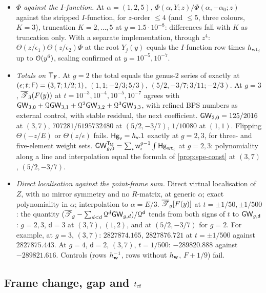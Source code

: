 \begin{itemize}
\item \emph{$\Phi$ against the $I$-function.} At $\alpha=(1,2,5)$, $\Phi(\alpha,Y;z)/\Phi(\alpha,-\alpha_0;z)$ against the stripped $I$-function, for $z$-order $\leq 4$ (and $\leq 5$, three colours, $K=3$), truncation $K=2,\dots,5$ at $y=1.5\cdot 10^{-8}$: differences fall with $K$ as truncation only. With a separate implementation, through $z^4$: $\Theta(z/\epsilon_1)\Theta(z/\epsilon_2)\Phi$ at the root $Y_j(y)$ equals the $I$-function row times $h_{\mathrm{wt}_j}$ up to $\mathcal{O}(y^6)$, scaling confirmed at $y=10^{-5},10^{-7}$.
\item \emph{Totals on $\mathsf{T}_{\mathrm{F}}$.} At $g=2$ the total equals the genus-$2$ series of \cite{BS} exactly at $(\epsilon;t;\mathsf{F})=(3,7;1/2;1)$, $(1,1;-2/3;5/3)$, $(5/2,-3/7;3/11;-2/3)$. At $g=3$, $\overline{\mathscr{T}}_3(F(y))$ at $t=10^{-3},10^{-4},10^{-5},10^{-7}$ agrees with $\mathsf{GW}_{3,0}+\mathcal{Q}\mathsf{GW}_{3,1}+\mathcal{Q}^2\mathsf{GW}_{3,2}+\mathcal{Q}^3\mathsf{GW}_{3,3}$, with refined BPS numbers as external control, with stable residual, the next coefficient. $\mathsf{GW}_{3,0}=125/2016$ at $(3,7)$, $707281/6195732480$ at $(5/2,-3/7)$, $1/10080$ at $(1,1)$. Flipping $\Theta(-z/E)$ or $\Theta(z/\epsilon)$ fails. $\mathsf{Hg}_{\mathsf{v}}=h_{\mathsf{v}}.1$ exactly at $g=2,3$, for three- and five-element weight sets. $\mathsf{GW}_{g,0}^{\mathsf{T}_{\!\mathrm{M}}}=\sum_i\mathsf{w}_i^{g-1}\int\mathsf{Hg}_{\mathrm{wt}_i}$ at $g=2,3$: polynomiality along a line and interpolation equal the formula of \cref{prop:spe-const} at $(3,7)$, $(5/2,-3/7)$.
\item \emph{Direct localisation against the point-frame sum.} Direct virtual localisation of $Z$, with no mirror symmetry and no $R$-matrix, at generic $\alpha$; exact polynomiality in $\alpha$; interpolation to $\alpha=E/3$. $\overline{\mathscr{T}}_g[F(y)]$ at $t=\pm1/50,\pm1/500$: the quantity $(\overline{\mathscr{T}}_g-\sum_{d<\mathsf{d}}\mathcal{Q}^d\mathsf{GW}_{g,d})/\mathcal{Q}^{\mathsf{d}}$ tends from both signs of $t$ to $\mathsf{GW}_{g,\mathsf{d}}$: $g=2,3$, $\mathsf{d}=3$ at $(3,7)$, $(1,2)$, and at $(5/2,-3/7)$ for $g=2$. For example, at $g=3$, $(3,7)$: $2827874.165$, $2827876.721$ at $t=\pm1/500$ against $2827875.443$. At $g=4$, $\mathsf{d}=2$, $(3,7)$, $t=1/500$: $-289820.888$ against $-289821.616$. Controls (rows $h_{\mathbf{w}}^{-1}$, rows without $h_{\mathbf{w}}$, $F+1/9$) fail.
\end{itemize}

\subsection{Frame change, gap and \texorpdfstring{$t_{\mathrm{cf}}$}{tcf}}
\label{sec:evi-fra}

